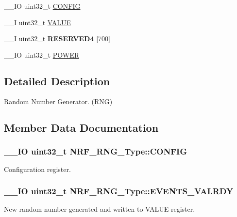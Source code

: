 \begin{DoxyCompactItemize}
\item 
\+\_\+\+\_\+\+I\+O uint32\+\_\+t \hyperlink{struct_n_r_f___r_n_g___type_ad08369e257ce3b0b9d4731d993b4669b}{C\+O\+N\+F\+I\+G}
\item 
\+\_\+\+\_\+\+I uint32\+\_\+t \hyperlink{struct_n_r_f___r_n_g___type_a2c8c3bc1f4a5841d4e869abc12d1efd9}{V\+A\+L\+U\+E}
\item 
\hypertarget{struct_n_r_f___r_n_g___type_a3f33148c5a14415882bba3b7d2ebc08f}{}\+\_\+\+\_\+\+I uint32\+\_\+t {\bfseries R\+E\+S\+E\+R\+V\+E\+D4} \mbox{[}700\mbox{]}\label{struct_n_r_f___r_n_g___type_a3f33148c5a14415882bba3b7d2ebc08f}

\item 
\+\_\+\+\_\+\+I\+O uint32\+\_\+t \hyperlink{struct_n_r_f___r_n_g___type_a49d1445004bfc038d23acf7f50c58e76}{P\+O\+W\+E\+R}
\end{DoxyCompactItemize}


\subsection{Detailed Description}
Random Number Generator. (R\+N\+G) 

\subsection{Member Data Documentation}
\hypertarget{struct_n_r_f___r_n_g___type_ad08369e257ce3b0b9d4731d993b4669b}{}
\subsubsection[{C\+O\+N\+F\+I\+G}]{\setlength{\rightskip}{0pt plus 5cm}\+\_\+\+\_\+\+I\+O uint32\+\_\+t N\+R\+F\+\_\+\+R\+N\+G\+\_\+\+Type\+::\+C\+O\+N\+F\+I\+G}\label{struct_n_r_f___r_n_g___type_ad08369e257ce3b0b9d4731d993b4669b}
Configuration register. \hypertarget{struct_n_r_f___r_n_g___type_a7d2095d123e89e017d96dbfd88941544}{}
\subsubsection[{E\+V\+E\+N\+T\+S\+\_\+\+V\+A\+L\+R\+D\+Y}]{\setlength{\rightskip}{0pt plus 5cm}\+\_\+\+\_\+\+I\+O uint32\+\_\+t N\+R\+F\+\_\+\+R\+N\+G\+\_\+\+Type\+::\+E\+V\+E\+N\+T\+S\+\_\+\+V\+A\+L\+R\+D\+Y}\label{struct_n_r_f___r_n_g___type_a7d2095d123e89e017d96dbfd88941544}
New random number generated and written to V\+A\+L\+U\+E register. \hypertarget{struct_n_r_f___r_n_g___type_a815579878334cf55a538a740f2bb6f25}{}
